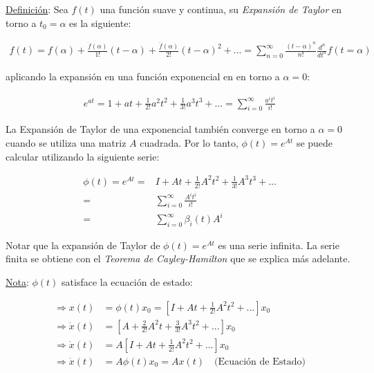 \noindent \underline{Definición}: Sea $f(t)$ una función suave y continua, su \emph{Expansión de Taylor} en torno a $t_0 = \alpha$ es la siguiente:

\begin{align*}
    f(t) = f(\alpha)+\frac{\dot{f}(\alpha)}{1!}(t-\alpha)+\frac{\ddot{f}(\alpha)}{2!}(t-\alpha)^2+... = \sum_{n=0}^{\infty}{\frac{(t - \alpha)^n}{n!}\frac{d^n}{dt^n}f(t = \alpha)}   
\end{align*}

aplicando la expansión en una función exponencial en en torno a $\alpha = 0$:

\begin{align*}
    e^{at} = 1+at+\frac{1}{2!}a^2t^2+\frac{1}{3!}a^3t^3+... = \sum_{i=0}^{\infty} \frac{a^i t^i}{i!} 
\end{align*}

La Expansión de Taylor de una exponencial también converge en torno a $\alpha = 0$ cuando se utiliza una matriz ${A}$ cuadrada. Por lo tanto, ${\phi}(t) = e^{{A}t}$ se puede calcular utilizando la siguiente serie:

\begin{subequations}
\begin{align}
     {\phi}(t) = e^{ {A}t} =&  {I}+ {A}t+\frac{1}{2!} {A}^2t^2+\frac{1}{3!} {A}^3t^3+... \\
     =& \sum_{i=0}^{\infty} \frac{A^i t^i}{i!} \\
     =& \sum_{i=0}^{\infty} \beta_i (t)A^i
\end{align}
\end{subequations}

Notar que la expansión de Taylor de ${\phi}(t) = e^{{A}t}$ es una serie infinita. La serie finita se obtiene con el \emph{Teorema de Cayley-Hamilton} que se explica más adelante.

\underline{Nota}: ${\phi}(t)$ satisface la ecuación de estado:

\begin{subequations}
\begin{align}
    \Longrightarrow {x}(t) &= {\phi}(t){x_0} = \left[{I}+{A}t+\frac{1}{2!}{A}^2t^2+...\right]{x_0}\\
    \Longrightarrow {\dot{x}}(t) &= \left[{A}+\frac{2}{2!}{A}^2t+\frac{3}{3!}{A}^3t^2+...\right]{x_0}\\
    \Longrightarrow {\dot{x}}(t) &=  {A}\left[{I}+{A}t+\frac{1}{2!}{A}^2t^2+...\right]{x_0}\\
    \Longrightarrow {\dot{x}}(t) &= {A}{\phi}(t){x_0}={A}{x}(t) \quad \text{(Ecuación de Estado)}
\end{align}
\end{subequations}

